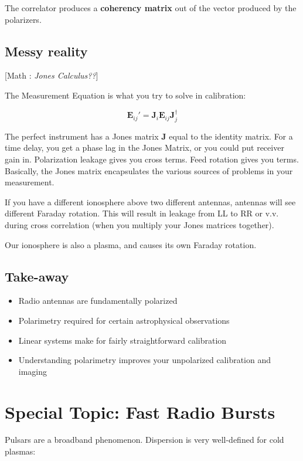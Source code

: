 \documentclass[a4paper]{article}
\newcommand{\Comment}[2]{ [{\color{red}\sc #1 :} {{\color{cyan} \it #2}}]}
\begin{document}
The correlator produces a \textbf{coherency matrix} out of the vector produced by the polarizers.

\subsection{Messy reality}

\Comment{Math}{Jones Calculus??}

The Measurement Equation is what you try to solve in calibration:

\begin{equation}
\mathbf{E}_{ij}' = \mathbf{J}_i \mathbf{E}_{ij} \mathbf{J}_j^\dag
\end{equation}

The perfect instrument has a Jones matrix $ \mathbf{J} $ equal to the identity matrix. For a time delay, you get a phase lag in the Jones Matrix, or you could put receiver gain in. Polarization leakage gives you cross terms. Feed rotation gives you terms. Basically, the Jones matrix encapsulates the various sources of problems in your measurement.

If you have a different ionosphere above two different antennas,
antennas will see different Faraday rotation. This will result in leakage from LL to RR or v.v. during cross correlation (when you multiply your Jones matrices together). 

Our ionosphere is also a plasma, and causes its own Faraday rotation.

\subsection{Take-away}

\begin{itemize}
\item Radio antennas are fundamentally polarized
\item Polarimetry required for certain astrophysical observations
\item Linear systems make for fairly straightforward calibration
\item Understanding polarimetry improves your unpolarized calibration and imaging
\end{itemize}

\section{Special Topic: Fast Radio Bursts}

Pulsars are a broadband phenomenon. Dispersion is very well-defined for cold plasmas:
\end{document}
